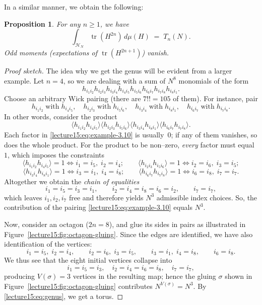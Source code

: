 \documentclass[letterpaper,11pt,oneside,reqno]{book}
\numberwithin{equation}{chapter}  %
\newtheorem{proposition}{Proposition}[chapter]  %
\theoremstyle{definition}
\begin{document}
In a similar manner, we obtain the following:
\begin{proposition}
	\label{lecture15:prop:traces-moments}
	For any $n\ge 1$, we have
	\[
		\int_{\mathcal{H}_N}\!\operatorname{tr}(H^{2n})\,d\mu(H)
		\;=\;
		T_n(N).
	\]
	Odd moments (expectations of $\operatorname{tr}(H^{2n+1})$) vanish.
\end{proposition}
\begin{proof}[Proof sketch]
	The idea why we get the genus will be evident from a larger example.
	Let $n=4$, so we are dealing with a sum of $N^{8}$ monomials of the form
\[
  h_{i_{1}i_{2}}
  h_{i_{2}i_{3}}
  h_{i_{3}i_{4}}
  h_{i_{4}i_{5}}
  h_{i_{5}i_{6}}
  h_{i_{6}i_{7}}
  h_{i_{7}i_{8}}
  h_{i_{8}i_{1}}.
\]
Choose an arbitrary Wick pairing (there are $7!!=105$ of them).
For instance, pair
\[
  h_{i_{1}i_{2}}\;\text{with}\;h_{i_{4}i_{5}},\quad
  h_{i_{2}i_{3}}\;\text{with}\;h_{i_{5}i_{6}},\quad
  h_{i_{3}i_{4}}\;\text{with}\;h_{i_{8}i_{1}},\quad
  h_{i_{6}i_{7}}\;\text{with}\;h_{i_{7}i_{8}}.
\]
In other words, consider the product
\begin{equation}
  \bigl\langle h_{i_{1}i_{2}}h_{i_{4}i_{5}}\bigr\rangle
  \bigl\langle h_{i_{2}i_{3}}h_{i_{5}i_{6}}\bigr\rangle
  \bigl\langle h_{i_{3}i_{4}}h_{i_{8}i_{1}}\bigr\rangle
  \bigl\langle h_{i_{6}i_{7}}h_{i_{7}i_{8}}\bigr\rangle.
  \label{lecture15:eq:example-3.10}
\end{equation}
Each factor in
\eqref{lecture15:eq:example-3.10} is usually~$0$; if any of them vanishes, so does
the whole product.  For the product to be non–zero, \emph{every} factor
must equal~$1$, which imposes the constraints
\[
  \langle h_{i_{1}i_{2}}h_{i_{4}i_{5}}\rangle = 1
  \iff
  i_{1}=i_{5},\; i_{2}=i_{4};
\qquad
  \langle h_{i_{2}i_{3}}h_{i_{5}i_{6}}\rangle = 1
  \iff
  i_{2}=i_{6},\; i_{3}=i_{5};
\]
\[
  \langle h_{i_{3}i_{4}}h_{i_{8}i_{1}}\rangle = 1
  \iff
  i_{3}=i_{1},\; i_{4}=i_{8};
\qquad
  \langle h_{i_{6}i_{7}}h_{i_{7}i_{8}}\rangle = 1
  \iff
  i_{6}=i_{8},\; i_{7}=i_{7}.
\]
Altogether we obtain the \emph{chain of equalities}
\[
  i_{1}=i_{5}=i_{3}=i_{1},\qquad
  i_{2}=i_{4}=i_{8}=i_{6}=i_{2},\qquad
  i_{7}=i_{7},
\]
which leaves $i_{1},i_{2},i_{7}$ free and therefore yields $N^{3}$
admissible index choices.  So, the contribution of the pairing
\eqref{lecture15:eq:example-3.10} equals $N^{3}$.

\medskip
Now,
consider an octagon ($2n=8$), and glue its sides in pairs as illustrated in
Figure~\ref{lecture15:fig:octagon-gluing}.  Since the edges are identified, we
have also identification of the vertices:
\[
  i_{1}=i_{5},\; i_{2}=i_{4},\qquad
  i_{2}=i_{6},\; i_{3}=i_{5},\qquad
  i_{3}=i_{1},\; i_{4}=i_{8},\qquad
	i_{6}=i_{8}.
\]
We thus see that the eight initial vertices collapse into
\[
  i_{1}=i_{5}=i_{3},\quad
  i_{2}=i_{4}=i_{6}=i_{8},\quad
  i_{7}=i_{7},
\]
producing $V(\sigma)=3$ vertices in the resulting map; hence the gluing
$\sigma$ shown in Figure~\ref{lecture15:fig:octagon-gluing} contributes
$N^{V(\sigma)} = N^{3}$.
By \eqref{lecture15:eq:genus}, we get a torus.
\end{proof}
\end{document}
